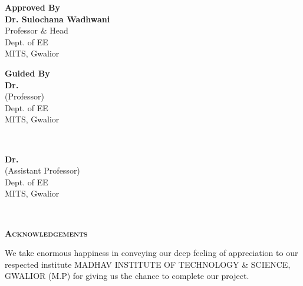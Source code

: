 \documentclass[12pt,openright,twoside]{report}
\begin{document}
\begin{minipage}{0.5\textwidth}
\begin{flushleft} \normalsize
\textbf{Approved By}\\[1.5cm]
\textbf{Dr. Sulochana Wadhwani }\\[0cm]
Professor $\&$ Head\\[0cm]
Dept. of EE\\[0cm]
MITS, Gwalior
\end{flushleft}
\end{minipage}
\begin{minipage}{0.5\textwidth}
\begin{flushright} \normalsize
\textbf{Guided By}\\[1.5cm]
\textbf{Dr.  }\\[0cm]
(Professor) \\[0cm]
Dept. of EE\\[0cm]
MITS, Gwalior
\end{flushright}
\end{minipage}\\[1.5cm]
\begin{minipage}{1\textwidth}
\begin{flushright} \normalsize
\textbf{Dr. }\\[0cm]
(Assistant Professor) \\[0cm]
Dept. of EE\\[0cm]
MITS, Gwalior
\end{flushright}
\end{minipage}\\[0.8cm]
\begin{minipage}{1\textwidth}
\begin{flushright} \normalsize

\end{flushright}
\end{minipage}
\newpage
\vspace*{-0.3cm}
\begin{center}
\textsc{\Large \bf Acknowledgements}
\end{center}\vspace{1cm}
\justify
\doublespace
We take enormous happiness in conveying our deep feeling of appreciation to our respected institute MADHAV INSTITUTE OF TECHNOLOGY & SCIENCE, GWALIOR (M.P) for giving us the chance to complete our project.
\end{document}
